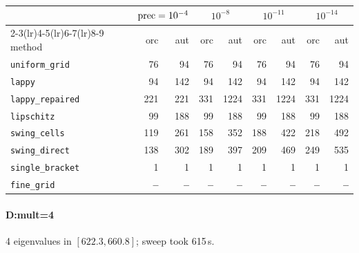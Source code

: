 \begin{center}
\small
\begin{tabular}{lrrrrrrrr}
\toprule
& \multicolumn{2}{c}{$\mathrm{prec}=10^{-4}$} & \multicolumn{2}{c}{$10^{-8}$} & \multicolumn{2}{c}{$10^{-11}$} & \multicolumn{2}{c}{$10^{-14}$} \\
\cmidrule(lr){2-3}\cmidrule(lr){4-5}\cmidrule(lr){6-7}\cmidrule(lr){8-9}
method & orc & aut & orc & aut & orc & aut & orc & aut \\
\midrule
\texttt{uniform\_grid} & 76 & 94 & 76 & 94 & 76 & 94 & 76 & 94 \\
\texttt{lappy} & 94 & 142 & 94 & 142 & 94 & 142 & 94 & 142 \\
\texttt{lappy\_repaired} & 221 & 221 & 331 & 1224 & 331 & 1224 & 331 & 1224 \\
\texttt{lipschitz} & 99 & 188 & 99 & 188 & 99 & 188 & 99 & 188 \\
\texttt{swing\_cells} & 119 & 261 & 158 & 352 & 188 & 422 & 218 & 492 \\
\texttt{swing\_direct} & 138 & 302 & 189 & 397 & 209 & 469 & 249 & 535 \\
\midrule
\texttt{single\_bracket} & 1 & 1 & 1 & 1 & 1 & 1 & 1 & 1 \\
\texttt{fine\_grid} & \textbf{--} & \textbf{--} & \textbf{--} & \textbf{--} & \textbf{--} & \textbf{--} & \textbf{--} & \textbf{--} \\
\bottomrule
\end{tabular}
\end{center}

\paragraph{D:mult=4} 4 eigenvalues in $[622.3, 660.8]$; sweep took 615\,s.

